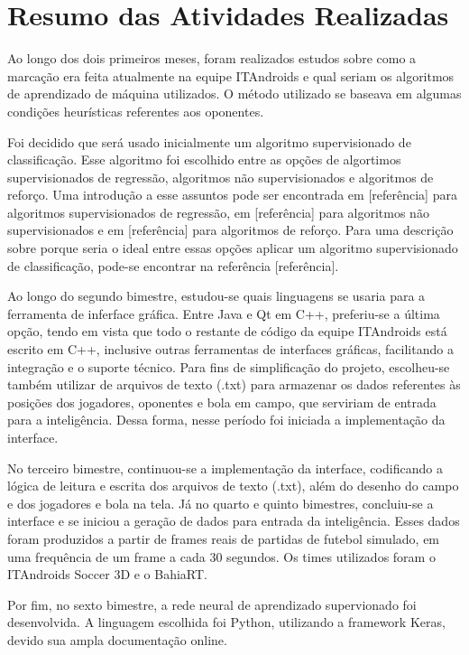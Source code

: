 \documentclass[a4paper,12pt]{article}
\begin{document}
\section{Resumo das Atividades Realizadas}
\label{secao:atividades_realizadas}

Ao longo dos dois primeiros meses, foram realizados estudos sobre como a marcação era feita atualmente na equipe ITAndroids e qual seriam os algoritmos de aprendizado de máquina utilizados. O método utilizado se baseava em algumas condições heurísticas referentes aos oponentes.

Foi decidido que será usado inicialmente um algoritmo supervisionado de classificação. Esse algoritmo foi escolhido entre as opções de algortimos supervisionados de regressão, algoritmos não supervisionados e algoritmos de reforço. Uma introdução a esse assuntos pode ser encontrada em [referência] para algoritmos supervisionados de regressão, em [referência] para algoritmos não supervisionados e em [referência] para algoritmos de reforço. Para uma descrição sobre porque seria o ideal entre essas opções aplicar um algoritmo supervisionado de classificação, pode-se encontrar na referência [referência].

Ao longo do segundo bimestre, estudou-se quais linguagens se usaria para a ferramenta de inferface gráfica. Entre Java e Qt em C++, preferiu-se a última opção, tendo em vista que todo o restante de código da equipe ITAndroids está escrito em C++, inclusive outras ferramentas de interfaces gráficas, facilitando a integração e o suporte técnico. Para fins de simplificação do projeto, escolheu-se também utilizar de arquivos de texto (.txt) para armazenar os dados referentes às posições dos jogadores, oponentes e bola em campo, que serviriam de entrada para a inteligência. Dessa forma, nesse período foi iniciada a implementação da interface.

No terceiro bimestre, continuou-se a implementação da interface, codificando a lógica de leitura e escrita dos arquivos de texto (.txt), além do desenho do campo e dos jogadores e bola na tela. Já no quarto e quinto bimestres, concluiu-se a interface e se iniciou a geração de dados para entrada da inteligência. Esses dados foram produzidos a partir de frames reais de partidas de futebol simulado, em uma frequência de um frame a cada 30 segundos. Os times utilizados foram o ITAndroids Soccer 3D e o BahiaRT.

Por fim, no sexto bimestre, a rede neural de aprendizado supervionado foi desenvolvida. A linguagem escolhida foi Python, utilizando a framework Keras, devido sua ampla documentação online.
\end{document}
